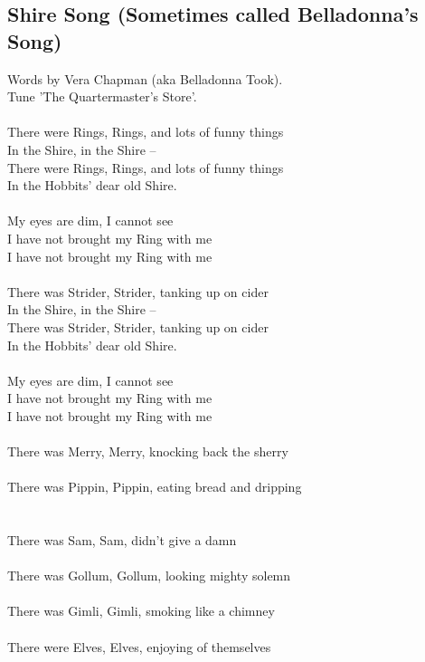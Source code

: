 \begin{multicols}{2}
\section{Shire Song (Sometimes called Belladonna’s Song)}
Words by Vera Chapman (aka Belladonna Took).
\\
Tune ’The Quartermaster’s Store’.
\\
\\
There were Rings, Rings, and lots of funny things
\\
In the Shire, in the Shire –
\\
There were Rings, Rings, and lots of funny things
\\
In the Hobbits’ dear old Shire.
\\
\\
My eyes are dim, I cannot see
\\
I have not brought my Ring with me
\\
I have not brought my Ring with me
\\
\\
There was Strider, Strider, tanking up on cider
\\
In the Shire, in the Shire –
\\
There was Strider, Strider, tanking up on cider
\\
In the Hobbits’ dear old Shire.
\\
\\
My eyes are dim, I cannot see
\\
I have not brought my Ring with me
\\
I have not brought my Ring with me
\\
\\
There was Merry, Merry, knocking back the sherry
\\
\\
There was Pippin, Pippin, eating bread and dripping
\\
\\
\\
There was Sam, Sam, didn’t give a damn
\\
\\
There was Gollum, Gollum, looking mighty solemn
\\
\\
There was Gimli, Gimli, smoking like a chimney
\\
\\
There were Elves, Elves, enjoying of themselves
\\
\\

\end{multicols}
